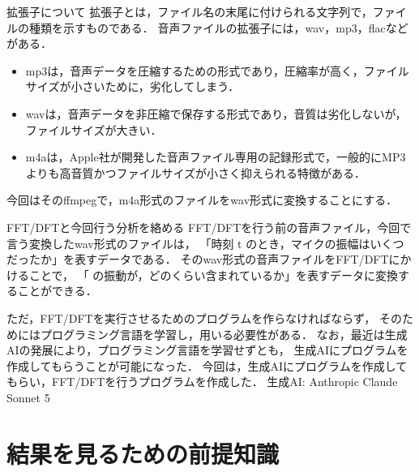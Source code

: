 \documentclass[dvipdfmx,uplatex]{beamer}
\begin{document}
\begin{frame}
    \begin{block}{拡張子について}
    拡張子とは，ファイル名の末尾に付けられる文字列で，ファイルの種類を示すものである．
    音声ファイルの拡張子には，wav，mp3，flacなどがある．
    \begin{itemize}
      \item mp3は，音声データを圧縮するための形式であり，圧縮率が高く，ファイルサイズが小さいために，劣化してしまう．
      \item wavは，音声データを非圧縮で保存する形式であり，音質は劣化しないが，ファイルサイズが大きい．
      \item m4aは，Apple社が開発した音声ファイル専用の記録形式で，一般的にMP3よりも高音質かつファイルサイズが小さく抑えられる特徴がある．
    \end{itemize}
    今回はそのffmpegで，m4a形式のファイルをwav形式に変換することにする．
  \end{block}
\end{frame}

\begin{frame}{FFT/DFTと今回行う分析を絡める}
  FFT/DFTを行う前の音声ファイル，今回で言う変換したwav形式のファイルは，
  「時刻 t のとき，マイクの振幅はいくつだったか」を表すデータである．
  そのwav形式の音声ファイルをFFT/DFTにかけることで，
  「 の振動が，どのくらい含まれているか」を表すデータに変換することができる．

  ただ，FFT/DFTを実行させるためのプログラムを作らなければならず，
  そのためにはプログラミング言語を学習し，用いる必要性がある．
  なお，最近は生成AIの発展により，プログラミング言語を学習せずとも，
  生成AIにプログラムを作成してもらうことが可能になった．
  今回は，生成AIにプログラムを作成してもらい，FFT/DFTを行うプログラムを作成した．
  生成AI: Anthropic Claude Sonnet 5
\end{frame}

\section{結果を見るための前提知識}
\end{document}
